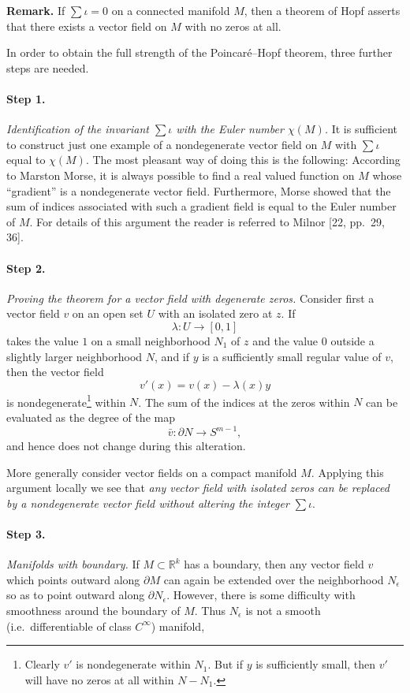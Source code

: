 
\noindent\textbf{Remark.} If $\sum \iota = 0$ on a connected manifold $M$, then a theorem of Hopf asserts that there exists a vector field on $M$ with no zeros at all.

In order to obtain the full strength of the Poincar\'e--Hopf theorem, three further steps are needed.

\paragraph{Step 1.} \emph{Identification of the invariant $\sum \iota$ with the Euler number $\chi(M)$.} It is sufficient to construct just one example of a nondegenerate vector field on $M$ with $\sum \iota$ equal to $\chi(M)$. The most pleasant way of doing this is the following: According to Marston Morse, it is always possible to find a real valued function on $M$ whose ``gradient'' is a nondegenerate vector field. Furthermore, Morse showed that the sum of indices associated with such a gradient field is equal to the Euler number of $M$. For details of this argument the reader is referred to Milnor [22, pp.~29, 36].

\paragraph{Step 2.} \emph{Proving the theorem for a vector field with degenerate zeros.} Consider first a vector field $v$ on an open set $U$ with an isolated zero at $z$. If
\[
\lambda : U \to [0, 1]
\]
takes the value $1$ on a small neighborhood $N_1$ of $z$ and the value $0$ outside a slightly larger neighborhood $N$, and if $y$ is a sufficiently small regular value of $v$, then the vector field
\[
v'(x) = v(x) - \lambda(x)y
\]
is nondegenerate\footnote{Clearly $v'$ is nondegenerate within $N_1$. But if $y$ is sufficiently small, then $v'$ will have no zeros at all within $N - N_1$.} within $N$. The sum of the indices at the zeros within $N$ can be evaluated as the degree of the map
\[
\bar{v} : \partial N \to S^{m-1},
\]
and hence does not change during this alteration.

More generally consider vector fields on a compact manifold $M$. Applying this argument locally we see that \emph{any vector field with isolated zeros can be replaced by a nondegenerate vector field without altering the integer} $\sum \iota$.

\paragraph{Step 3.} \emph{Manifolds with boundary.} If $M \subset \mathbb{R}^k$ has a boundary, then any vector field $v$ which points outward along $\partial M$ can again be extended over the neighborhood $N_\epsilon$ so as to point outward along $\partial N_\epsilon$. However, there is some difficulty with smoothness around the boundary of $M$. Thus $N_\epsilon$ is not a smooth (i.e.\ differentiable of class $C^\infty$) manifold,



